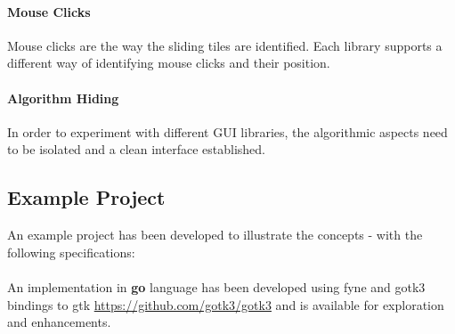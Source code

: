 \documentclass[a4paper,12pt]{article}
\theoremstyle{mytheor}
\begin{document}
\paragraph{Mouse Clicks}  Mouse clicks are the way the sliding tiles are identified. Each library supports a different way of identifying mouse clicks and their position. 

\paragraph{Algorithm Hiding} In order to experiment with different GUI libraries, the algorithmic aspects need to be isolated and a clean interface established.

\subsection*{Example Project}

An example project has been developed to illustrate the concepts - with the following specifications:

\paragraph{}

\paragraph{}

An implementation in \textbf{go} language has been developed using fyne and gotk3 bindings to gtk \url{https://github.com/gotk3/gotk3} and is available for exploration and enhancements. 

\end{document}
